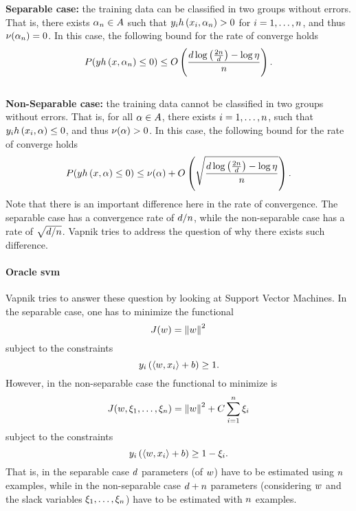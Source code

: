 \textbf{Separable case:} the training data can be classified in two groups without errors. That is, there exists $\alpha_n \in A$ such that $y_i h\left(x_i, \alpha_n\right) > 0$ for $i = 1, \ldots, n$, and thus $\nu(\alpha_n) = 0$.
In this case, the following bound for the rate of converge holds
\begin{equation}
    \nonumber
    P(y h\left(x, \alpha_n\right) \leq 0) \leq O\left( \frac{d \log\left(\frac{2n}{d} \right) - \log\eta}{n}  \right) .
\end{equation}
\\
\textbf{Non-Separable case:} the training data cannot be classified in two groups without errors. That is, for all $\alpha \in A$, there exists $i = 1, \ldots, n$, such that $y_i h\left(x_i, \alpha\right) \leq 0$, and thus $\nu(\alpha) > 0$.
In this case, the following bound for the rate of converge holds
\begin{equation}
    \nonumber
    P(y h\left(x, \alpha\right) \leq 0) \leq \nu(\alpha) + O\left( \sqrt{\frac{d \log\left(\frac{2n}{d} \right) - \log\eta}{n}}  \right) .
\end{equation}
Note that there is an important difference here in the rate of convergence. The separable case has a convergence rate of $d/n$, while the non-separable case has a rate of $\sqrt{d/n}$. Vapnik tries to address the question of why there exists such difference.

\paragraph*{Oracle \acrshort{svm}\\}
Vapnik tries to answer these question by looking at Support Vector Machines. In the separable case, one has to minimize the functional 
$$J(w) = \left\lVert w\right\rVert^2$$
subject to the constraints
$$y_i \left( \left\langle w, x_i \right\rangle + b \right) \geq 1.$$
However, in the non-separable case the functional to minimize is 
$$J(w, \xi_1, \ldots, \xi_n) = \left\lVert w\right\rVert^2 + C \sum_{i=1}^n \xi_i$$
subject to the constraints
$$y_i \left( \left\langle w, x_i \right\rangle + b \right) \geq 1 - \xi_i.$$
That is, in the separable case $d$ parameters (of $w$) have to be estimated using $n$ examples, while in the non-separable case $d + n$ parameters (considering $w$ and the slack variables $\xi_1, \ldots, \xi_n$) have to be estimated with $n$ examples. 

